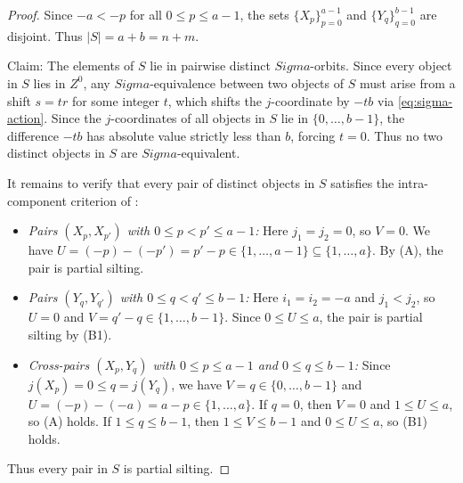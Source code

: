 \documentclass[11pt, a4paper]{article}
\theoremstyle{definition}
\def\Sigma{Sigma}%
\def\mathcal#1{#1}%
\begin{document}
\begin{proof}
Since $-a < -p$ for all $0 \le p \le a-1$, the sets $\{X_p\}_{p=0}^{a-1}$ and $\{Y_q\}_{q=0}^{b-1}$ are disjoint. Thus $|S| = a + b = n + m$.

Claim: The elements of $S$ lie in pairwise distinct $\Sigma$-orbits.
Since every object in $S$ lies in $\mathcal Z^0$, any $\Sigma$-equivalence between two objects of $S$ must arise from a shift $s = t r$ for some integer $t$, which shifts the $j$-coordinate by $-t b$ via \eqref{eq:sigma-action}. Since the $j$-coordinates of all objects in $S$ lie in $\{0, \ldots, b-1\}$, the difference $-tb$ has absolute value strictly less than $b$, forcing $t = 0$. Thus no two distinct objects in $S$ are $\Sigma$-equivalent.

It remains to verify that every pair of distinct objects in $S$ satisfies the intra-component criterion of :
\begin{itemize}
  \item \emph{Pairs $(X_p, X_{p'})$ with $0 \le p < p' \le a-1$:} Here $j_1 = j_2 = 0$, so $V = 0$. We have $U = (-p) - (-p') = p' - p \in \{1, \ldots, a-1\} \subseteq \{1, \ldots, a\}$. By (A), the pair is partial silting.
  \item \emph{Pairs $(Y_q, Y_{q'})$ with $0 \le q < q' \le b-1$:} Here $i_1 = i_2 = -a$ and $j_1 < j_2$, so $U = 0$ and $V = q' - q \in \{1, \ldots, b-1\}$. Since $0 \le U \le a$, the pair is partial silting by (B1).
  \item \emph{Cross-pairs $(X_p, Y_q)$ with $0 \le p \le a-1$ and $0 \le q \le b-1$:} Since $j(X_p) = 0 \le q = j(Y_q)$, we have $V = q \in \{0, \ldots, b-1\}$ and $U = (-p) - (-a) = a - p \in \{1, \ldots, a\}$. If $q = 0$, then $V = 0$ and $1 \le U \le a$, so (A) holds. If $1 \le q \le b-1$, then $1 \le V \le b-1$ and $0 \le U \le a$, so (B1) holds.
\end{itemize}
Thus every pair in $S$ is partial silting.
\end{proof}
\end{document}
